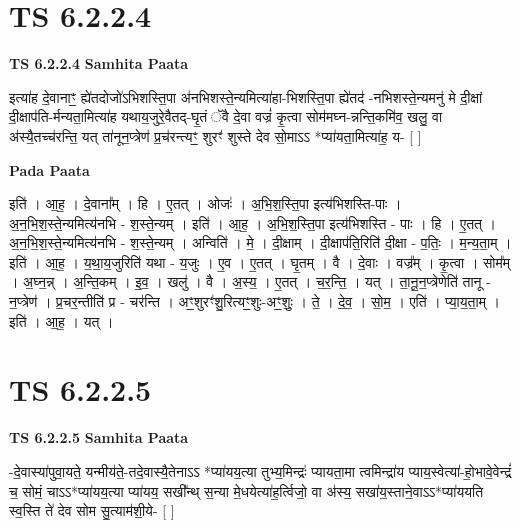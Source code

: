 \documentclass[17pt]{extarticle}
\begin{document}

\section{ TS 6.2.2.4 }

\textbf{TS 6.2.2.4 } \newline
\textbf{Samhita Paata} \newline

इत्या॑ह दे॒वानाꣳ॒॒ ह्ये॑तदोजो॑ऽभिशस्ति॒पा अ॑नभिशस्ते॒न्यमित्या॑हा-भिशस्ति॒पा ह्ये॑तद॑ -नभिशस्ते॒न्यमनु॑ मे दी॒क्षां दी॒क्षाप॑ति-र्मन्यता॒मित्या॑ह यथाय॒जुरे॒वैतद्-घृ॒तं ॅवै दे॒वा वज्रं॑ कृ॒त्वा सोम॑मघ्न-न्नन्ति॒कमि॑व॒ खलु॒ वा अ॑स्यै॒तच्च॑रन्ति॒ यत् ता॑नून॒प्त्रेण॑ प्र॒च॑रन्त्यꣳ॒॒ शुरꣳ॑ शुस्ते देव सो॒माऽऽ *प्या॑यता॒मित्या॑ह॒ य- [  ] \newline

\textbf{Pada Paata} \newline

इति॑ । आ॒ह॒ । दे॒वाना᳚म् । हि । ए॒तत् । ओजः॑ । अ॒भि॒श॒स्ति॒पा इत्य॑भिशस्ति-पाः । अ॒न॒भि॒श॒स्ते॒न्यमित्य॑नभि - श॒स्ते॒न्यम् । इति॑ । आ॒ह॒ । अ॒भि॒श॒स्ति॒पा इत्य॑भिशस्ति - पाः । हि । ए॒तत् । अ॒न॒भि॒श॒स्ते॒न्यमित्य॑नभि - श॒स्ते॒न्यम् । अन्विति॑ । मे॒ । दी॒क्षाम् । दी॒क्षाप॑ति॒रिति॑ दी॒क्षा - प॒तिः॒ । म॒न्य॒ता॒म् । इति॑ । आ॒ह॒ । य॒था॒य॒जुरिति॑ यथा - य॒जुः । ए॒व । ए॒तत् । घृ॒तम् । वै । दे॒वाः । वज्र᳚म् । कृ॒त्वा । सोम᳚म् । अ॒घ्न॒न्न् । अ॒न्ति॒कम् । इ॒व॒ । खलु॑ । वै । अ॒स्य॒ । ए॒तत् । च॒र॒न्ति॒ । यत् । ता॒नू॒न॒प्त्रेणेति॑ तानू - न॒प्त्रेण॑ । प्र॒चर॒न्तीति॑ प्र - चर॑न्ति । अꣳ॒॒शुरꣳ॑शु॒रित्यꣳ॒॒शुः-अꣳ॒॒शुः॒ । ते॒ । दे॒व॒ । सो॒म॒ । एति॑ । प्या॒य॒ता॒म् । इति॑ । आ॒ह॒ । यत् ।  \newline





\section{ TS 6.2.2.5 }

\textbf{TS 6.2.2.5 } \newline
\textbf{Samhita Paata} \newline

-दे॒वास्या॑पुवा॒यते॒ यन्मीय॑ते॒-तदे॒वास्यै॒तेनाऽऽ *प्या॑यय॒त्या तुभ्य॒मिन्द्रः॑ प्यायता॒मा त्वमिन्द्रा॑य प्याय॒स्वेत्या॑-हो॒भावे॒वेन्द्रं॑ च॒ सोमं॒ चाऽऽ*प्या॑यय॒त्या प्या॑यय॒ सखी᳚न्थ् स॒न्या मे॒धयेत्या॑ह॒र्त्विजो॒ वा अ॑स्य॒ सखा॑य॒स्ताने॒वाऽऽ*प्या॑ययति स्व॒स्ति ते॑ देव सोम सु॒त्याम॑शी॒ये- [  ] \newline
\end{document}
